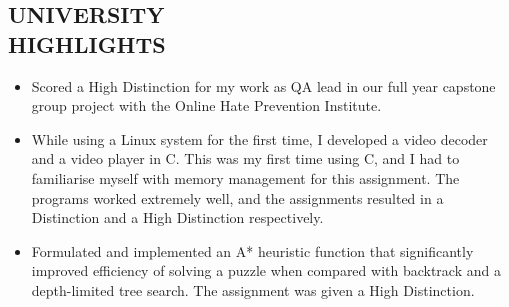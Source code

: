 \documentclass[margin, 10pt]{res} %
\begin{document}
\begin{resume}
\section{UNIVERSITY \\ HIGHLIGHTS} 

\begin{itemize}

\item Scored a High Distinction for my work as QA lead in our full year capstone group project with the Online Hate Prevention Institute.  
\item While using a Linux system for the first time, I developed a video decoder and a video player in C. This was my first time using C, and I had to familiarise myself with memory management for this assignment. The programs worked extremely well, and the assignments resulted in a Distinction and a High Distinction respectively. 
\item Formulated and implemented an A* heuristic function that significantly improved efficiency of solving a puzzle when compared with backtrack and a depth-limited tree search. The assignment was given a High Distinction.

\end{itemize}


\end{resume}
\end{document}

